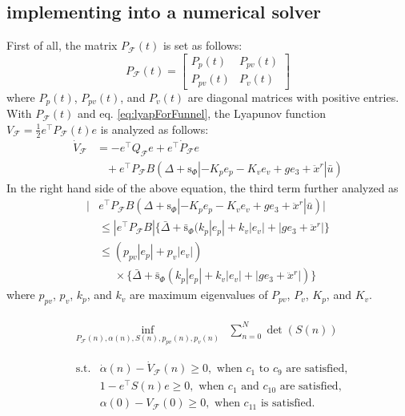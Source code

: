 \documentclass[letterpaper, 10 pt, conference]{ieeeconf}  %
\begin{document}
\subsection{implementing into a numerical solver}
First of all, the matrix $P_\mathcal{F}(t)$ is set as follows:
\begin{equation}
P_\mathcal{F}(t) = \left[
\begin{array}{cc}
P_p(t) & P_{pv}(t) \\
P_{pv}(t) & P_v(t)
\end{array}
\right] \nonumber
\end{equation}
where $P_p(t)$, $P_{pv}(t)$, and $P_v(t)$ are diagonal matrices with positive entries.
With $P_\mathcal{F}(t)$ and eq. \eqref{eq:lyapForFunnel}, the Lyapunov function $V_\mathcal{F} = \frac{1}{2}e^\intercal P_\mathcal{F}(t) e$ is analyzed as follows: 
\begin{align}
\dot{V}_\mathcal{F} &= -e^\intercal Q_\mathcal{F} e + e^\intercal \dot{P}_\mathcal{F} e\nonumber \\
&\;\;\;+e^\intercal P_\mathcal{F} B(\Delta+\text{s}_\Phi|-K_pe_p -K_ve_v + ge_3 + \ddot{x}^r|\bar{u}) \nonumber
\end{align}
In the right hand side of the above equation, the third term further analyzed as
\begin{align}
|&e^\intercal P_\mathcal{F} B(\Delta+\text{s}_\Phi|-K_p e_p -K_v e_v + ge_3 + \ddot{x}^r|\bar{u})| \nonumber \\
&\leq |e^\intercal P_\mathcal{F}B|\{\bar{\Delta} + \bar{\text{s}}_\Phi(k_p|e_p| + k_v|e_v| + |ge_3+\ddot{x}^r|\} \nonumber \\
&\leq (p_{pv}|e_p|+p_v|e_v|)\nonumber \\
&\;\;\;\;\;\times \{\bar{\Delta}+\bar{\text{s}}_\Phi(k_p|e_p|+k_v|e_v|+|ge_3+\ddot{x}^r|)\} \nonumber
\end{align}
where $p_{pv}$, $p_v$, $k_p$, and $k_v$ are maximum eigenvalues of $P_{pv}$, $P_v$, $K_p$, and $K_v$.



\begin{align}
&
\begin{array}{rl}
\displaystyle{\inf_{P_\mathcal{F}(n),\alpha(n),S(n),p_{pv}(n),p_v(n)}} & \sum_{n=0}^{N} \det(S(n)) \nonumber \\
\end{array} \nonumber \\
&
\begin{array}{rl}
\displaystyle{\text{s.t.}}& \dot{\alpha}(n) - \dot{V}_\mathcal{F}(n) \geq 0,\text{ when $c_1$ to $c_9$ are satisfied}, \nonumber \\
& 1-e^\intercal S(n) e \geq 0,\text{ when $c_1$ and $c_{10}$ are satisfied}, \nonumber \\
& \alpha(0) - V_\mathcal{F}(0) \geq 0,\text{ when $c_{11}$ is satisfied}. \nonumber
\end{array} \nonumber 
\end{align}
\end{document}
